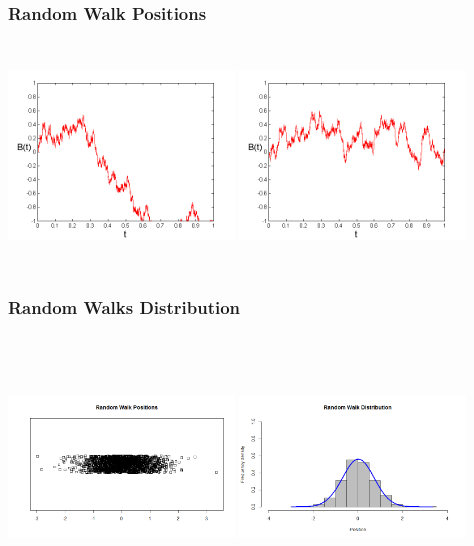 \documentclass{beamer}   %
\begin{document}
\begin{frame}
    \frametitle{Random Walk Positions}
    \hspace{-7mm}
    \vspace{4mm}
\includegraphics[height=6cm,width=6cm]{rw3}
\includegraphics[height=6cm,width=6cm]{rw4}
\end{frame}

\begin{frame}
    \frametitle{Random Walks Distribution}
    \hspace{-5mm}
    \vspace{4mm}
\includegraphics[height=7cm,width=6cm]{rw_jitter}
\includegraphics[height=7cm,width=6cm]{rw_hist}
\end{frame}
\end{document}
